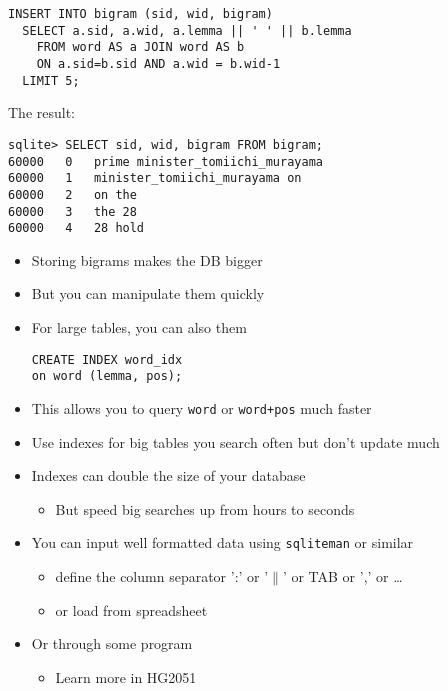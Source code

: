\documentclass[a4paper,landscape,headrule,footrule,dvips]{foils}
\begin{document}
\begin{CJK}{UTF8}{min}
\begin{verbatim}
INSERT INTO bigram (sid, wid, bigram) 
  SELECT a.sid, a.wid, a.lemma || ' ' || b.lemma  
    FROM word AS a JOIN word AS b 
    ON a.sid=b.sid AND a.wid = b.wid-1 
  LIMIT 5;
\end{verbatim}

The result:

\begin{verbatim}
sqlite> SELECT sid, wid, bigram FROM bigram;
60000	0	prime minister_tomiichi_murayama
60000	1	minister_tomiichi_murayama on
60000	2	on the
60000	3	the 28
60000	4	28 hold
\end{verbatim}

\begin{itemize}
\item Storing bigrams makes the DB bigger
\item But you can manipulate them quickly
\item For large tables, you can also  them
\begin{verbatim}
CREATE INDEX word_idx
on word (lemma, pos);
\end{verbatim}
\item This allows you to query \texttt{word} or \texttt{word+pos} much faster
\item Use indexes for big tables you search often but don't update much
\item Indexes can double the size of your database
  \begin{itemize}
  \item But speed big searches up from hours to seconds
  \end{itemize}


\end{itemize}


\begin{itemize}
\item You can input well formatted data using \texttt{sqliteman} or similar
  \begin{itemize}
  \item define the column separator ':' or '$\|$' or TAB or ',' or \ldots
  \item or load from spreadsheet
  \end{itemize}
\item Or through some program
  \begin{itemize}
  \item Learn more in HG2051
  \end{itemize}
\end{itemize}




\end{CJK}
\end{document}
